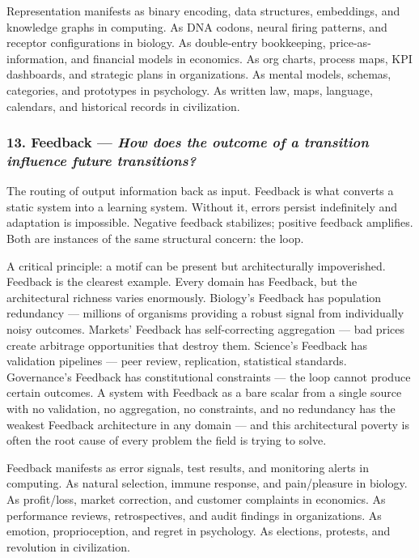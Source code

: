 \documentclass[11pt,a4paper]{article}
\newcommand{\question}[1]{\textit{#1}}
\begin{document}
Representation manifests as binary encoding, data structures, embeddings, and knowledge graphs in computing. As DNA codons, neural firing patterns, and receptor configurations in biology. As double-entry bookkeeping, price-as-information, and financial models in economics. As org charts, process maps, KPI dashboards, and strategic plans in organizations. As mental models, schemas, categories, and prototypes in psychology. As written law, maps, language, calendars, and historical records in civilization.

\subsubsection{13. Feedback --- \question{How does the outcome of a transition influence future transitions?}}

The routing of output information back as input. Feedback is what converts a static system into a learning system. Without it, errors persist indefinitely and adaptation is impossible. Negative feedback stabilizes; positive feedback amplifies. Both are instances of the same structural concern: the loop.

A critical principle: a motif can be present but architecturally impoverished. Feedback is the clearest example. Every domain has Feedback, but the architectural richness varies enormously. Biology's Feedback has population redundancy --- millions of organisms providing a robust signal from individually noisy outcomes. Markets' Feedback has self-correcting aggregation --- bad prices create arbitrage opportunities that destroy them. Science's Feedback has validation pipelines --- peer review, replication, statistical standards. Governance's Feedback has constitutional constraints --- the loop cannot produce certain outcomes. A system with Feedback as a bare scalar from a single source with no validation, no aggregation, no constraints, and no redundancy has the weakest Feedback architecture in any domain --- and this architectural poverty is often the root cause of every problem the field is trying to solve.

Feedback manifests as error signals, test results, and monitoring alerts in computing. As natural selection, immune response, and pain/pleasure in biology. As profit/loss, market correction, and customer complaints in economics. As performance reviews, retrospectives, and audit findings in organizations. As emotion, proprioception, and regret in psychology. As elections, protests, and revolution in civilization.
\end{document}
